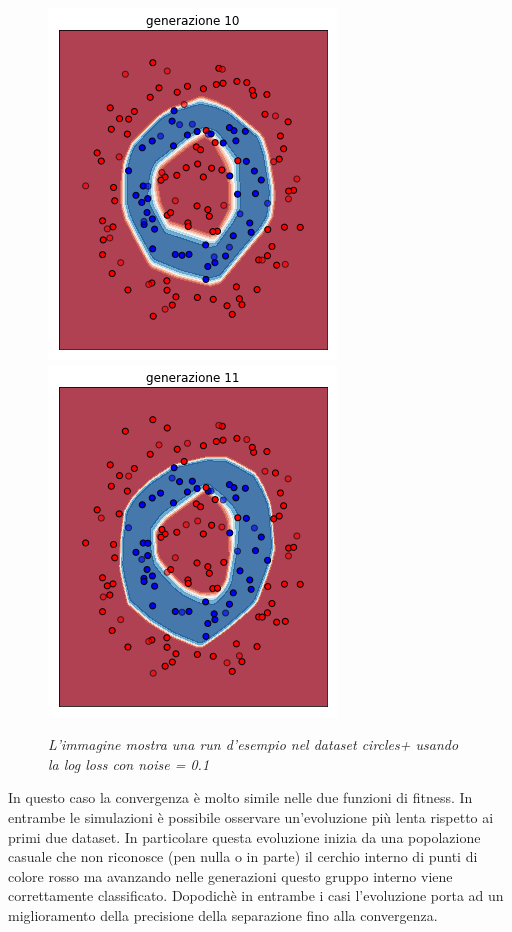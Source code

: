 \documentclass[12pt,a4paper]{report}
\begin{document}
\begin{figure}[H]
 \includegraphics[scale = 0.37]{images/circle+-rnd-log./10}
 \includegraphics[scale = 0.37]{images/circle+-rnd-log./11}
 \caption{\textit{L'immagine mostra una run d'esempio nel dataset circles+ usando la log loss con noise = 0.1}}
 \label{circles+2}
\end{figure}

In questo caso la convergenza è molto simile nelle due funzioni di fitness.
In entrambe le simulazioni è possibile osservare un'evoluzione più lenta rispetto ai primi due dataset.
In particolare questa evoluzione inizia da una popolazione casuale che non riconosce (pen nulla o in parte) il cerchio interno di punti di colore rosso ma avanzando nelle generazioni questo gruppo interno viene correttamente classificato. 
Dopodichè in entrambe i casi l'evoluzione porta ad un miglioramento della precisione della separazione fino alla convergenza.
\end{document}
